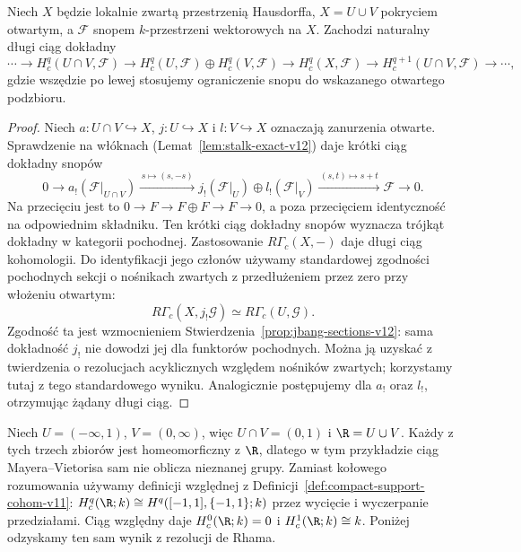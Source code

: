 \begin{lemat}
\label{lem:sheaf-mv-v12}
Niech $X$ będzie lokalnie zwartą przestrzenią Hausdorffa,
$X=U\cup V$ pokryciem otwartym, a $\mathcal F$ snopem
$k$-przestrzeni wektorowych na $X$. Zachodzi naturalny
długi ciąg dokładny
\[
\cdots\longrightarrow H_c^q(U\cap V,\mathcal F)
\longrightarrow H_c^q(U,\mathcal F)\oplus H_c^q(V,\mathcal F)
\longrightarrow H_c^q(X,\mathcal F)
\longrightarrow H_c^{q+1}(U\cap V,\mathcal F)\longrightarrow\cdots,
\]
gdzie wszędzie po lewej stosujemy ograniczenie snopu do
wskazanego otwartego podzbioru.
\end{lemat}
\begin{proof}
Niech $a:U\cap V\hookrightarrow X$, $j:U\hookrightarrow X$
i $l:V\hookrightarrow X$ oznaczają zanurzenia otwarte.
Sprawdzenie na włóknach (Lemat~\ref{lem:stalk-exact-v12}) daje krótki
ciąg dokładny snopów
\[
0\longrightarrow a_!(\mathcal F|_{U\cap V})
\xrightarrow{\,s\mapsto(s,-s)\,}
 j_!(\mathcal F|_U)\oplus l_!(\mathcal F|_V)
\xrightarrow{\,(s,t)\mapsto s+t\,}\mathcal F\longrightarrow0.
\]
Na przecięciu jest to $0\to F\to F\oplus F\to F\to0$,
a poza przecięciem identyczność na odpowiednim składniku.
Ten krótki ciąg dokładny snopów wyznacza trójkąt
dokładny w kategorii pochodnej. Zastosowanie
$R\Gamma_c(X,-)$ daje długi ciąg kohomologii.
Do identyfikacji jego członów używamy standardowej
zgodności pochodnych sekcji o nośnikach zwartych
z przedłużeniem przez zero przy włożeniu otwartym:
\[
R\Gamma_c(X,j_!\mathcal G)\simeq R\Gamma_c(U,\mathcal G).
\]
Zgodność ta jest wzmocnieniem
Stwierdzenia~\ref{prop:jbang-sections-v12}:
sama dokładność $j_!$ nie dowodzi jej dla funktorów
pochodnych. Można ją uzyskać z twierdzenia o
rezolucjach acyklicznych względem nośników zwartych;
korzystamy tutaj z tego standardowego wyniku.
Analogicznie postępujemy dla $a_!$ oraz $l_!$,
otrzymując żądany długi ciąg.
\end{proof}

\begin{przyklad}[Obliczenie $H_c^*(\R;k)$]
Niech $U=(-\infty,1)$, $V=(0,\infty)$, więc $U\cap V=(0,1)$
i $\R=U\cup V$. Każdy z tych trzech zbiorów jest homeomorficzny
z $\R$, dlatego w tym przykładzie ciąg Mayera--Vietorisa
sam nie oblicza nieznanej grupy. Zamiast kołowego rozumowania
używamy definicji względnej z
Definicji~\ref{def:compact-support-cohom-v11}:
$H_c^q(\R;k)\cong H^q([-1,1],\{-1,1\};k)$
przez wycięcie i wyczerpanie przedziałami. Ciąg względny daje
$H_c^0(\R;k)=0$ i $H_c^1(\R;k)\cong k$.
Poniżej odzyskamy ten sam wynik z rezolucji de Rhama.
\end{przyklad}

